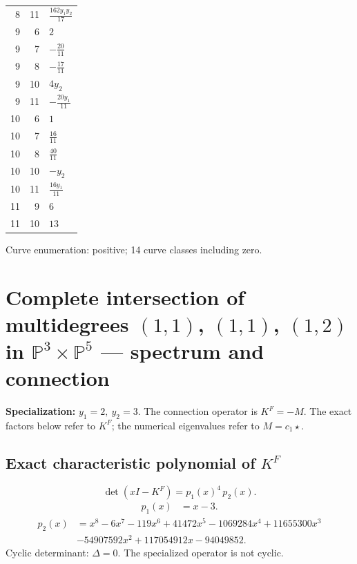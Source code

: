 \documentclass[10pt,a4paper]{article}
\begin{document}
{\begin{longtable}{rrp{125mm}}
8 & 11 & $\frac{162 y_{1} y_{2}}{17}$\\
9 & 6 & $2$\\
9 & 7 & $- \frac{20}{11}$\\
9 & 8 & $- \frac{17}{11}$\\
9 & 10 & $4 y_{2}$\\
9 & 11 & $- \frac{20 y_{1}}{11}$\\
10 & 6 & $1$\\
10 & 7 & $\frac{16}{11}$\\
10 & 8 & $\frac{40}{11}$\\
10 & 10 & $- y_{2}$\\
10 & 11 & $\frac{16 y_{1}}{11}$\\
11 & 9 & $6$\\
11 & 10 & $13$\\
\end{longtable}}
Curve enumeration: positive; 14 curve classes including zero.
\clearpage\section*{Complete intersection of multidegrees $(1,1)$, $(1,1)$, $(1,2)$ in $\mathbb P^{3}\times \mathbb P^{5}$ --- spectrum and connection}
\textbf{Specialization:} $y_1=2,\ y_2=3$. The connection operator is $K^F=-M$. The exact factors below refer to $K^F$; the numerical eigenvalues refer to $M=c_1\star$.
\subsection*{Exact characteristic polynomial of $K^F$}
\[\det(xI-K^F)=p_{1}(x)^{4}\,p_{2}(x).\]
\[\begin{aligned}p_{1}(x)&=x - 3.\end{aligned}\]
\[\begin{aligned}p_{2}(x)&=x^{8} - 6 x^{7} - 119 x^{6} + 41472 x^{5} - 1069284 x^{4} + 11655300 x^{3}\\&- 54907592 x^{2} + 117054912 x - 94049852.\end{aligned}\]
Cyclic determinant: $\Delta=0$. The specialized operator is not cyclic.
\end{document}
